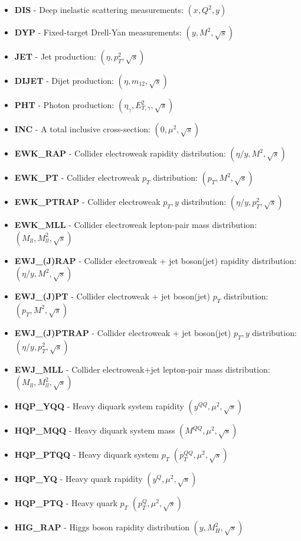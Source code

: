 \documentclass[11pt]{article}
\begin{document}
\begin{itemize}
\item \textbf{DIS} - Deep inelastic scattering measurements: $(x,Q^2,y)$
\item \textbf{DYP} - Fixed-target Drell-Yan measurements: $(y,M^2,\sqrt{s})$
\item \textbf{JET} - Jet production: $(\eta,p_T^2,\sqrt{s})$
\item \textbf{DIJET} - Dijet production: $(\eta,m_{12},\sqrt{s})$
\item \textbf{PHT} - Photon production: $(\eta_\gamma,E_{T,\gamma}^2,\sqrt{s})$
\item \textbf{INC} - A total inclusive cross-section: $(0,\mu^2,\sqrt{s})$
\item \textbf{EWK\_RAP} - Collider electroweak rapidity distribution: $(\eta/y,M^2,\sqrt{s})$
\item \textbf{EWK\_PT} - Collider electroweak $p_T$ distribution: $(p_T,M^2,\sqrt{s})$
\item \textbf{EWK\_PTRAP} - Collider electroweak $p_T, y$ distribution: $(\eta/y, p_T^2,\sqrt{s})$
\item \textbf{EWK\_MLL} - Collider electroweak lepton-pair mass distribution: $(M_{ll},M_{ll}^2,\sqrt{s})$
\item \textbf{EWJ\_(J)RAP} - Collider electroweak + jet boson(jet) rapidity distribution: $(\eta/y,M^2,\sqrt{s})$
\item \textbf{EWJ\_(J)PT} - Collider electroweak + jet boson(jet) $p_T$ distribution: $(p_T,M^2,\sqrt{s})$
\item \textbf{EWJ\_(J)PTRAP} - Collider electroweak + jet boson(jet) $p_T, y$ distribution: $(\eta/y, p_T^2,\sqrt{s})$
\item \textbf{EWJ\_MLL} - Collider electroweak+jet lepton-pair mass distribution: $(M_{ll},M_{ll}^2,\sqrt{s})$
\item \textbf{HQP\_YQQ} - Heavy diquark system rapidity $(y^{QQ},\mu^2,\sqrt{s})$
\item \textbf{HQP\_MQQ} - Heavy diquark system mass $(M^{QQ},\mu^2,\sqrt{s})$
\item \textbf{HQP\_PTQQ} - Heavy diquark system $p_T$ $(p_T^{QQ},\mu^2,\sqrt{s})$
\item \textbf{HQP\_YQ} - Heavy quark rapidity $(y^Q,\mu^2,\sqrt{s})$
\item \textbf{HQP\_PTQ} - Heavy quark $p_T$ $(p_T^Q,\mu^2,\sqrt{s})$
\item \textbf{HIG\_RAP} - Higgs boson rapidity distribution $(y,M_H^2,\sqrt{s})$
\end{itemize}
\end{document}
